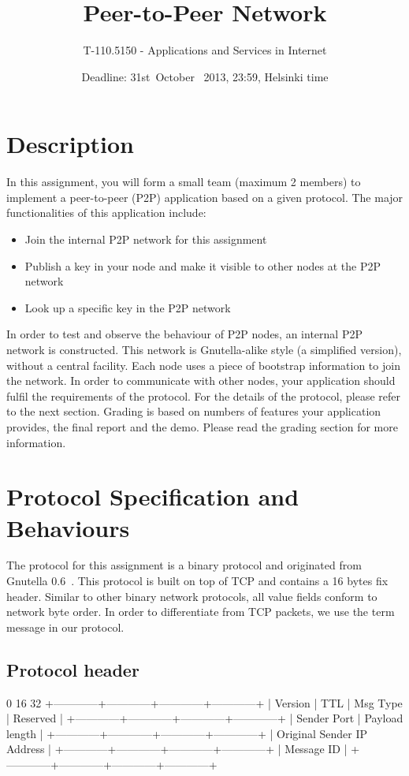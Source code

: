 \documentclass[12pt, a4paper]{article}
\date{Deadline: 31st\ October \ 2013, 23:59, Helsinki time}
\title{Peer-to-Peer Network}
\author{T-110.5150 - Applications and Services in Internet}
\begin{document}
\maketitle
\section{Description}
In this assignment, you will form a small team (maximum 2 members) to implement a peer-to-peer (P2P) application based on a given protocol. The major functionalities of this application include:
\begin{itemize}
\item Join the internal P2P network for this assignment
\item Publish a key in your node and make it visible to other nodes at the P2P network
\item Look up a specific key in the P2P network
\end{itemize}

In order to test and observe the behaviour of P2P nodes, an internal P2P network is constructed.
This network is Gnutella-alike style (a simplified version), without a central facility.
Each node uses a piece of bootstrap information to join the network.
In order to communicate with other nodes, your application should fulfil the requirements of the protocol.
For the details of the protocol, please refer to the next section.
Grading is based on numbers of features your application provides, the final report and the demo.
Please read the grading section for more information.

\section{Protocol Specification and Behaviours}
The protocol for this assignment is a binary protocol and originated from Gnutella 0.6~\cite{gnutella}.
This protocol is built on top of TCP and contains a 16 bytes fix header.
Similar to other binary network protocols, all value fields conform to network byte order.
In order to differentiate from TCP packets, we use the term message in our protocol.

\subsection{Protocol header}
\begin{verbbox}
0                          16                        32
+------------+------------+------------+------------+
|  Version   |     TTL    | Msg Type   |  Reserved  |
+------------+------------+------------+------------+
|       Sender Port       |       Payload length    |
+------------+------------+------------+------------+
|            Original Sender IP Address             |
+------------+------------+------------+------------+
|                     Message ID                    |
+------------+------------+------------+------------+
\end{verbbox}
\end{document}
